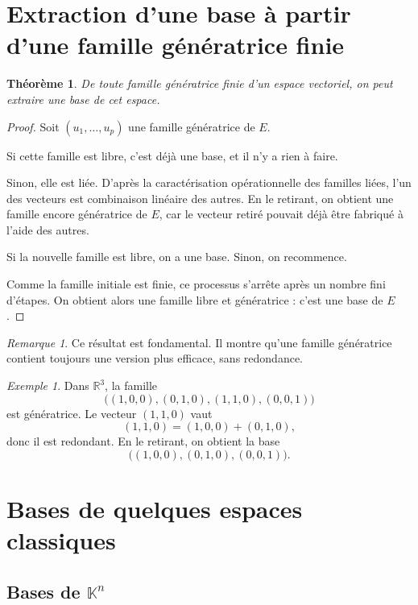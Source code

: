 \documentclass[11pt,a4paper]{article}
\newtheorem{theoreme}[definition]{Théorème}
\theoremstyle{remark}
\newtheorem{remarque}[definition]{Remarque}
\newtheorem{exemple}[definition]{Exemple}
\newcommand{\R}{\mathbb{R}}
\newcommand{\K}{\mathbb{K}}
\begin{document}
\section{Extraction d’une base à partir d’une famille génératrice finie}

\begin{theoreme}
De toute famille génératrice finie d’un espace vectoriel, on peut extraire une base de cet espace.
\end{theoreme}

\begin{proof}
Soit \((u_1,\dots,u_p)\) une famille génératrice de \(E\).

Si cette famille est libre, c’est déjà une base, et il n’y a rien à faire.

Sinon, elle est liée. D’après la caractérisation opérationnelle des familles liées, l’un des vecteurs est combinaison linéaire des autres. En le retirant, on obtient une famille encore génératrice de \(E\), car le vecteur retiré pouvait déjà être fabriqué à l’aide des autres.

Si la nouvelle famille est libre, on a une base. Sinon, on recommence.

Comme la famille initiale est finie, ce processus s’arrête après un nombre fini d’étapes. On obtient alors une famille libre et génératrice : c’est une base de \(E\).
\end{proof}

\begin{remarque}
Ce résultat est fondamental. Il montre qu’une famille génératrice contient toujours une version plus efficace, sans redondance.
\end{remarque}

\begin{exemple}
Dans \(\R^3\), la famille
\[
\big((1,0,0),(0,1,0),(1,1,0),(0,0,1)\big)
\]
est génératrice. Le vecteur \((1,1,0)\) vaut
\[
(1,1,0)=(1,0,0)+(0,1,0),
\]
donc il est redondant. En le retirant, on obtient la base
\[
\big((1,0,0),(0,1,0),(0,0,1)\big).
\]
\end{exemple}

\section{Bases de quelques espaces classiques}

\subsection{Bases de \(\K^n\)}
\end{document}
